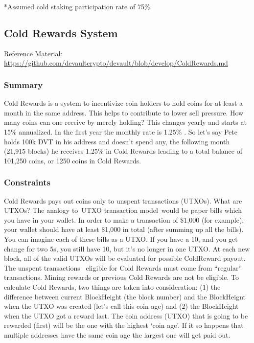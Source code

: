 {*Assumed cold staking participation rate of 75\%.}

\hypertarget{h.xc6vji4r4g6e}{%
\subsection{\texorpdfstring{{Cold Rewards System
}}{Cold Rewards System }}\label{h.xc6vji4r4g6e}}

{Reference Material:
}{\href{https://www.google.com/url?q=https://github.com/devaultcrypto/devault/blob/develop/ColdRewards.md\&sa=D\&ust=1574537005297000}{https://github.com/devaultcrypto/devault/blob/develop/ColdRewards.md}}

\hypertarget{h.57rdcm3qxbam}{%
\subsubsection{\texorpdfstring{{Summary}}{Summary}}\label{h.57rdcm3qxbam}}

{Cold Rewards is a system to incentivize coin holders to hold coins for
at least a month in the same address. This helps to contribute to lower
sell pressure. How many coins can one receive by merely holding? This
changes yearly and starts at 15\% annualized. In the first year the
monthly rate is 1.25\% . So let's say Pete holds 100k DVT in his address
and doesn't spend any, the following month (21,915 blocks) he receives
1.25\% in Cold Rewards leading to a total balance of 101,250 coins, or
1250 coins in Cold Rewards.}

\hypertarget{h.s2r93qanslz8}{%
\subsubsection{\texorpdfstring{{Constraints}}{Constraints}}\label{h.s2r93qanslz8}}

{Cold Rewards pays out coins only to unspent transactions (UTXOs). What
are UTXOs? }{The analogy to~}{UTXO transaction model}{~would be paper
bills which you have in your wallet. In order to make a transaction of
\$1,000 (for example), your wallet should have at least \$1,000 in total
(after summing up all the bills). You can imagine each of these bills as
a UTXO. If you have a 10, and you get change for two 5s, you still have
10, but it's no longer in one UTXO. A}{t each new block, all of the
valid UTXOs will be evaluated for possible ColdReward payout. The
unspent transactions ~eligible for Cold Rewards must come from
``regular'' transactions. Mining rewards or previous Cold Rewards are
not be eligible. To calculate Cold Rewards, two things are taken into
consideration: (1) the difference between current BlockHeight (the block
number) and the BlockHeignt when the UTXO was created (let's call this
coin age) and (2) the BlockHeight when the UTXO got a reward last. The
coin address (UTXO) that is going to be rewarded (first) will be the one
with the highest `coin age'. If it so happens that multiple addresses
have the same coin age the largest one will get paid out. }

